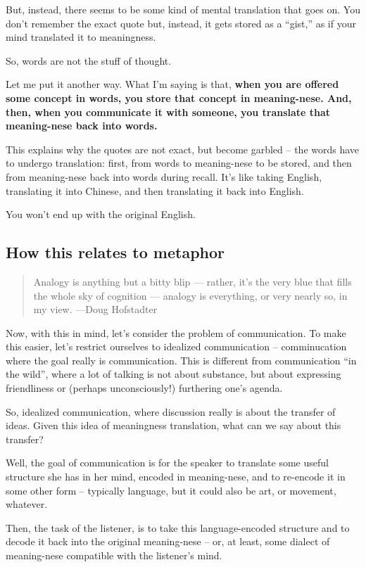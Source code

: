But, instead, there seems to be some kind of mental translation that
goes on. You don't remember the exact quote but, instead, it gets stored
as a ``gist,'' as if your mind translated it to meaningness.

So, words are not the stuff of thought.

Let me put it another way. What I'm saying is that, \textbf{when you are
offered some concept in words, you store that concept in meaning-nese.
And, then, when you communicate it with someone, you translate that
meaning-nese back into words.}

This explains why the quotes are not exact, but become garbled -- the
words have to undergo translation: first, from words to meaning-nese to
be stored, and then from meaning-nese back into words during recall.
It's like taking English, translating it into Chinese, and then
translating it back into English.

You won't end up with the original English.

\subsection{How this relates to
metaphor}\label{how-this-relates-to-metaphor}

\begin{quote}
Analogy is anything but a bitty blip --- rather, it's the very blue that
fills the whole sky of cognition --- analogy is everything, or very
nearly so, in my view. \label{quote-attribute}{---Doug Hofstadter}
\end{quote}

Now, with this in mind, let's consider the problem of communication. To
make this easier, let's restrict ourselves to idealized communication --
comminucation where the goal really is communication. This is different
from communication ``in the wild'', where a lot of talking is not about
substance, but about expressing friendliness or (perhaps unconsciously!)
furthering one's agenda.

So, idealized communication, where discussion really is about the
transfer of ideas. Given this idea of meaningness translation, what can
we say about this transfer?

Well, the goal of communication is for the speaker to translate some
useful structure she has in her mind, encoded in meaning-nese, and to
re-encode it in some other form -- typically language, but it could also
be art, or movement, whatever.

Then, the task of the listener, is to take this language-encoded
structure and to decode it back into the original meaning-nese -- or, at
least, some dialect of meaning-nese compatible with the listener's mind.

